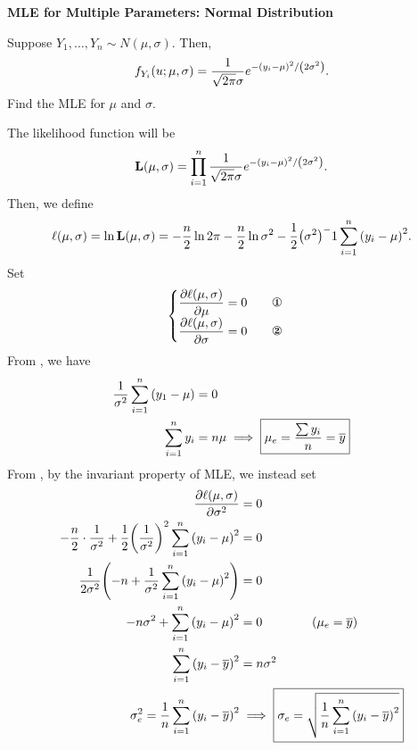 \begin{eg}
	\textbf{MLE for Multiple Parameters: Normal Distribution}
	\par Suppose $Y_1,\dots,Y_n\sim N(\mu,\sigma)$. Then, \[f_{Y_i}(u;\mu,\sigma)=\dfrac{1}{\sqrt{2\pi}\sigma}e^{-\qty(y_i-\mu)^2/\qty(2\sigma^2)}.\] Find the MLE for $\mu$ and $\sigma$.
	\begin{sol}
		The likelihood function will be \[\vb{L}(\mu,\sigma)=\prod_{i=1}^n\dfrac{1}{\sqrt{2\pi}\sigma}e^{-\qty(y_i-\mu)^2/\qty(2\sigma^2)}.\] Then, we define \[\ell(\mu,\sigma)=\ln \vb{L}(\mu,\sigma)=-\dfrac{n}{2}\ln2\pi-\dfrac{n}{2}\ln\sigma^2-\dfrac{1}{2}\qty(\sigma^2)^-1\sum_{i=1}^n\qty(y_i-\mu)^2.\] Set \[\begin{cases}\dsst\pdv{\l(\mu,\sigma)}{\mu}=0\quad\quad\text{\ding{172}}\\\dsst\pdv{\l(\mu,\sigma)}{\sigma}=0\qquad\text{\ding{173}}\end{cases}\] From , we have \begin{align*}\dfrac{1}{\sigma^2}\sum_{i=1}^n\qty(y_1-\mu)&=0\\\sum_{i=1}^ny_i&=n\mu\implies\boxed{\mu_e=\dfrac{\sum y_i}{n}=\overline{y}}\end{align*} From , by the invariant property of MLE, we instead set \begin{align*}\displaystyle\pdv{\ell(\mu,\sigma)}{\sigma^2}&=0\\-\dfrac{n}{2}\cdot\dfrac{1}{\sigma^2}+\dfrac{1}{2}\qty(\dfrac{1}{\sigma^2})^2\sum_{i=1}^n\qty(y_i-\mu)^2&=0\\\dfrac{1}{2\sigma^2}\qty(-n+\dfrac{1}{\sigma^2}\sum_{i=1}^n\qty(y_i-\mu)^2)&=0\\-n\sigma^2+\sum_{i=1}^n\qty(y_i-\mu)^2&=0\qquad\qquad(\mu_e=\overline{y})\\\sum_{i=1}^n\qty(y_i-\overline{y})^2&=n\sigma^2\\\sigma_e^2=\dfrac{1}{n}\sum_{i=1}^n\qty(y_i-\overline{y})^2&\implies\boxed{\sigma_e=\sqrt{\dfrac{1}{n}\sum_{i=1}^n\qty(y_i-\overline{y})^2}}\end{align*}
	\end{sol}
\end{eg}

